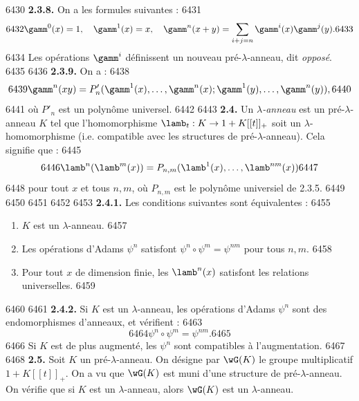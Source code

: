   6430	\noindent\textbf{2.3.8.} On a les formules suivantes :
  6431	\begin{equation}
  6432	\gamm^0(x) = 1, \quad \gamm^1(x) = x, \quad \gamm^n(x+y) = \sum_{i+j=n} \gamm^i(x) \gamm^j(y).
  6433	\end{equation}
  6434	Les op\'erations $\gamm^i$ d\'efinissent un nouveau pr\'e-$\lambda$-anneau, dit \emph{oppos\'e}.
  6435	
  6436		\noindent\textbf{2.3.9.} On a :
  6438	\begin{equation}
  6439	\gamm^n(xy) = P'_n(\gamm^1(x), \ldots, \gamm^n(x); \gamm^1(y), \ldots, \gamm^n(y)),
  6440	\end{equation}
  6441	o\`u $P'_n$ est un polyn\^ome universel.
  6442	
  6443		\noindent\textbf{2.4.} Un \emph{$\lambda$-anneau} est un pr\'e-$\lambda$-anneau $K$ tel que l'homomorphisme $\lamb_t : K \to 1 + K[[t]]_+$ soit un $\lambda$-homomorphisme (i.e. compatible avec les structures de pr\'e-$\lambda$-anneau). Cela signifie que :
  6445	\begin{equation}
  6446	\lamb^n(\lamb^m(x)) = P_{n,m}(\lamb^1(x), \ldots, \lamb^{nm}(x))
  6447	\end{equation}
  6448	pour tout $x$ et tous $n, m$, o\`u $P_{n,m}$ est le polyn\^ome universiel de 2.3.5.
  6449	
  6450	%
  6451	%
  6452	%
  6453		\noindent\textbf{2.4.1.} Les conditions suivantes sont \'equivalentes :
  6455	\begin{enumerate}
  6456	\item $K$ est un $\lambda$-anneau.
  6457	\item Les op\'erations d'Adams $\psi^n$ satisfont $\psi^n \circ \psi^m = \psi^{nm}$ pour tous $n, m$.
  6458	\item Pour tout $x$ de dimension finie, les $\lamb^n(x)$ satisfont les relations universelles.
  6459	\end{enumerate}
  6460	
  6461		\noindent\textbf{2.4.2.} Si $K$ est un $\lambda$-anneau, les op\'erations d'Adams $\psi^n$ sont des endomorphismes d'anneaux, et v\'erifient :
  6463	\begin{equation}
  6464	\psi^n \circ \psi^m = \psi^{nm}.
  6465	\end{equation}
  6466	Si $K$ est de plus augment\'e, les $\psi^n$ sont compatibles \`a l'augmentation.
  6467	
  6468		\noindent\textbf{2.5.} Soit $K$ un pr\'e-$\lambda$-anneau. On d\'esigne par $\wG(K)$ le groupe multiplicatif $1 + K[[t]]_+$. On a vu que $\wG(K)$ est muni d'une structure de pr\'e-$\lambda$-anneau. On v\'erifie que si $K$ est un $\lambda$-anneau, alors $\wG(K)$ est un $\lambda$-anneau.

